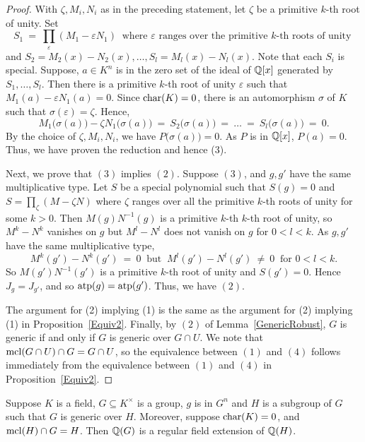 \begin{proof}
With \(\zeta, M_i, N_i \) as in the preceding statement, let \( \zeta\) be a primitive \(k\)-th root of unity. Set 
$$ S_1\ =\ \prod_\varepsilon (M_1- \varepsilon N_1 )\ \text{ where } \varepsilon \text{ ranges over the primitive } k\text{-th roots of unity }$$
and \( S_2 = M_2(x)-N_2(x), \ldots, S_l = M_l(x)-N_l(x) \). 
Note that each \(S_i\) is special. 
Suppose,  \(a \in K^n \) is in the zero set of the ideal of $\mathbb{Q}[x]$ generated by \( S_1, \ldots, S_l\). 
Then there is a primitive \(k\)-th root of unity \( \varepsilon\) such that \( M_1(a)- \varepsilon N_1(a)=0 \). Since \(\mathrm{char}(K)=0\), there is an automorphism \(\sigma\) of \(K\) such that \( \sigma( \varepsilon) = \zeta \). 
Hence, $$ M_1\big(\sigma(a)\big)- \zeta N_1\big(\sigma(a)\big) \ =\ S_2\big( \sigma(a)\big)\ =\ \ldots\ =\ S_l\big( \sigma(a) \big)\ =\ 0.$$
By the choice of \(\zeta, M_i, N_i \), we have \( P\big( \sigma(a) \big) =0\). As \(P \) is in \(\mathbb{Q}[x]\), \(P(a) =0\). Thus, we have proven the reduction and hence (3).

Next, we prove that $(3)$ implies $(2)$. Suppose \( (3) \), and \(g, g'\) have the same multiplicative type.
Let $ S $ be a special polynomial such that 
$S(g)=0$ and $S = \prod_\zeta (M- \zeta N)$ where $\zeta$ ranges over all the primitive $k$-th roots of unity for some $k>0$.
Then $M(g)N^{-1}(g)$ is a primitive $k$-th $k$-th root of unity, so $M^k-N^k$ vanishes on $g$ but $M^l-N^l$ does not vanish on $g$ for $0<l<k$.
As $g, g'$ have the same multiplicative type, $$M^k(g')-N^k(g')\ =\ 0\ \text{ but }\ M^l(g')-N^l(g')\ \neq\ 0\ \text{ for }0<l<k.$$
So $M(g')N^{-1}(g')$ is a primitive $k$-th root of unity and $S(g')=0$. 
Hence \( J_g = J_{g'} \), and so \(\mathrm{atp}(g)=\mathrm{atp}(g') \). Thus, we have \( (2)\). 

The argument for (2) implying (1)  is the same as the argument for (2) implying (1) in Proposition~\ref{Equiv2}. Finally, by $(2)$ of Lemma~\ref{GenericRobust}, \( G\) is generic if and only if \(G\) is generic over \( G \cap U\). We note that \(\mathrm{mcl}(G\cap U) \cap G = G \cap U \), so the equivalence between \( (1) \) and \( (4) \) follows immediately from the equivalence between \( (1) \) and \( (4) \) in Proposition~\ref{Equiv2}. 
\end{proof}

\begin{prop} \label{Regularity}
Suppose $K$ is a field, $G \subseteq K^\times $ is a group, $g$ is in $G^n$ and $H$ is a subgroup of $G$ such that $G$ is generic over $H$. Moreover, suppose \(\mathrm{char}(K)=0  \), and $\mathrm{mcl}(H)\cap G = H$. Then $\mathbb{Q}(G)$ is a regular field extension of $\mathbb{Q}(H)$.
\end{prop}

